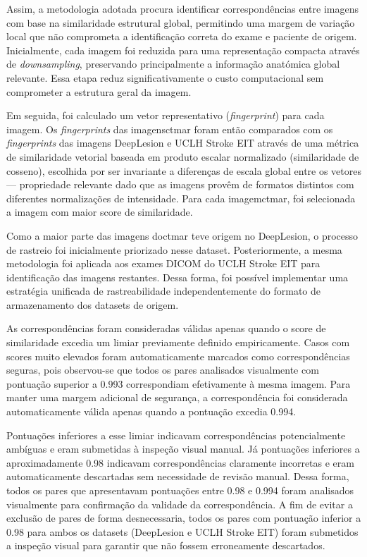 Assim, a metodologia adotada procura identificar correspondências entre imagens com base na similaridade estrutural global, permitindo uma margem de variação local que não comprometa a identificação correta do exame e paciente de origem. Inicialmente, cada imagem foi reduzida para uma representação compacta através de \textit{downsampling}, preservando principalmente a informação anatómica global relevante. Essa etapa reduz significativamente o custo computacional sem comprometer a estrutura geral da imagem.

Em seguida, foi calculado um vetor representativo (\textit{fingerprint}) para cada imagem. Os \textit{fingerprints} das imagens\acrshort{ctmar} foram então comparados com os \textit{fingerprints} das imagens DeepLesion e UCLH Stroke EIT através de uma métrica de similaridade vetorial baseada em produto escalar normalizado (similaridade de cosseno), escolhida por ser invariante a diferenças de escala global entre os vetores — propriedade relevante dado que as imagens provêm de formatos distintos com diferentes normalizações de intensidade. Para cada imagem\acrshort{ctmar}, foi selecionada a imagem com maior score de similaridade.

Como a maior parte das imagens do\acrshort{ctmar} teve origem no DeepLesion, o processo de rastreio foi inicialmente priorizado nesse dataset. Posteriormente, a mesma metodologia foi aplicada aos exames DICOM do UCLH Stroke EIT para identificação das imagens restantes. Dessa forma, foi possível implementar uma estratégia unificada de rastreabilidade independentemente do formato de armazenamento dos datasets de origem.

As correspondências foram consideradas válidas apenas quando o score de similaridade excedia um limiar previamente definido empiricamente. Casos com scores muito elevados foram automaticamente marcados como correspondências seguras, pois observou-se que todos os pares analisados visualmente com pontuação superior a 0.993 correspondiam efetivamente à mesma imagem. Para manter uma margem adicional de segurança, a correspondência foi considerada automaticamente válida apenas quando a pontuação excedia 0.994.

Pontuações inferiores a esse limiar indicavam correspondências potencialmente ambíguas e eram submetidas à inspeção visual manual. Já pontuações inferiores a aproximadamente 0.98 indicavam correspondências claramente incorretas e eram automaticamente descartadas sem necessidade de revisão manual. Dessa forma, todos os pares que apresentavam pontuações entre 0.98 e 0.994 foram analisados visualmente para confirmação da validade da correspondência. A fim de evitar a exclusão de pares de forma desnecessaria, todos os pares com pontuação inferior a 0.98 para ambos os datasets (DeepLesion e UCLH Stroke EIT) foram submetidos a inspeção visual para garantir que não fossem erroneamente descartados.

